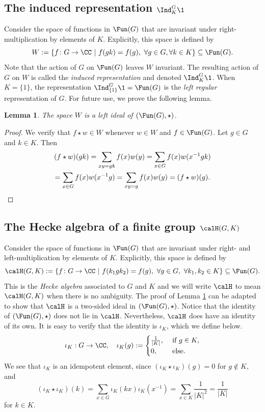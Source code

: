 \documentclass[11pt]{amsart}
\newtheorem{lem}[thm]{Lemma}
\theoremstyle{remark}
\begin{document}
\subsection{The induced representation $\Ind_K^G \1$}\label{Section1.2}
Consider the space of functions in $\Fun(G)$ that are invariant under right-multiplication by elements of $K$.
Explicitly, this space is defined by
\[
	W: = \{f\colon G\to \CC\ |\ f(gk) = f(g),\ \forall g\in G, \forall k \in K\} \subseteq \Fun(G).
\]
Note that the action of $G$ on $\Fun(G)$ leaves $W$ invariant.
The resulting action of $G$ on $W$ is called the \emph{induced representation} and denoted $\Ind_K^G \1$.
When $K=\{1\}$, the representation $\Ind_{\{1\}}^G\1=\Fun(G)$ is the \emph{left regular} representation of $G$.
For future use, we prove the following lemma.
\begin{lem}\label{lemma: W_left_ideal}
	The space $W$ is a left ideal of $(\Fun(G),\star)$.
\end{lem}
\begin{proof}
	We verify that $f\star w\in W$ whenever $w\in W$ and $f\in\Fun(G)$.
	Let $g\in G$ and $k\in K$.
	Then
	\begin{multline*}
		(f\star w)(gk) = \sum_{xy=gk} f(x)w(y) = \sum_{x\in G} f(x)w(x^{-1}gk) \\
		= \sum_{x\in G} f(x)w(x^{-1}g) = \sum_{xy=g} f(x)w(y) = (f\star w)(g).\qedhere
	\end{multline*}
\end{proof}


\subsection{The Hecke algebra of a finite group $\calH(G,K)$}\label{Section1.3}
Consider the space of functions in $\Fun(G)$ that are invariant under right- and left-multiplication by elements of $K$.
Explicitly, this space is defined by
\[
	\calH(G,K) := \{f\colon G\to \CC\ |\ f(k_1gk_2) = f(g),\ \forall g\in G,\ \forall k_1,k_2\in K\} \subseteq \Fun(G).
\]
This is the \emph{Hecke algebra} associated to $G$ and $K$ and we will write $\calH$ to mean $\calH(G,K)$ when there is no ambiguity.
The proof of Lemma \ref{lemma: W_left_ideal} can be adapted to show that $\calH$ is a two-sided ideal in $(\Fun(G),\star)$.
Notice that the identity of $(\Fun(G),\star)$ does not lie in $\calH$.
Nevertheless, $\calH$ does have an identity of its own.
It is easy to verify that the identity is $\iota_K$, which we define below.
\[
	\iota_K:G\to\CC,\quad \iota_K(g) := \begin{cases}
		\frac{1}{|K|},\  & \text{if}\ g\in K, \\
		0,\              & \text{else}.
	\end{cases}
\]
We see that $\iota_K$ is an idempotent element, since $(\iota_K\star\iota_K)(g)=0$ for $g\notin K$, and
\[
	(\iota_K\star\iota_K)(k) = \sum_{x\in G} \iota_K(kx)\iota_K(x^{-1}) = \sum_{x\in K} \frac{1}{|K|^2} = \frac{1}{|K|}
\]
for $k\in K$.
\end{document}
